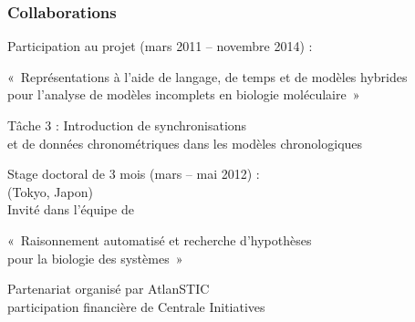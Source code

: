 \begin{frame}[c]
  \frametitle{Collaborations}

Participation au projet  (mars 2011 -- novembre 2014) :
\begin{center}
«~Représentations à l’aide de langage, de temps et de modèles hybrides\\
pour l’analyse de modèles incomplets en biologie moléculaire~»
\end{center}
Tâche 3 : Introduction de synchronisations\\
et de données chronométriques dans les modèles chronologiques

\bigskip
\bigskip
Stage doctoral de 3 mois (mars -- mai 2012) :\\
 (Tokyo, Japon)\\
Invité dans l'équipe de 
\begin{center}
«~Raisonnement automatisé et recherche d'hypothèses\\
pour la biologie des systèmes~»
\end{center}
Partenariat organisé par AtlanSTIC\\
participation financière de Centrale Initiatives







\end{frame}

